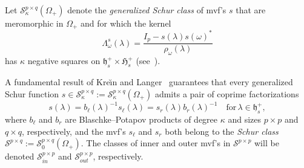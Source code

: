 \documentclass[12pt,twoside,a4paper]{amsart}
\theoremstyle{definition}
\numberwithin{equation}{section}
\begin{document}
Let ${\mathcal S}_{\kappa}^{p\times q}(\Omega_+)$ denote the {\it generalized
Schur class} of mvf's $s$
that are meromorphic in $\Omega_+$ and for which the kernel
\begin{equation}\label{kerLambda}
{\mathsf \Lambda}_\omega^s(\lambda)=
\frac{I_{p}-s(\lambda)s(\omega)^*}{\rho_\omega(\lambda)}
\end{equation}
has $\kappa$ negative squares on ${\mathfrak h}_s^+\times{\mathfrak
H}_s^+$ (see~\cite{KL}).

A fundamental result of  Kre\u{\i}n and Langer~\cite{KL} guarantees that  every
generalized Schur function $s\in
{\mathcal S}_{\kappa}^{p\times q}:={\mathcal S}_{\kappa}^{p\times q}(\Omega_+)$ admits a pair of
coprime factorizations
\begin{equation}\label{KL}
s({\lambda})=b_{\ell}({\lambda})^{-1}s_{\ell}({\lambda})=s_r({\lambda})b_r({\lambda})^{-1}
\quad\text{for}\, {\lambda}\in{\mathfrak h}_s^+,
\end{equation}
where $b_{\ell}$ and $b_r$ are Blaschke--Potapov products of degree
$\kappa$ and sizes ${p\times p}$ and ${q\times q}$, respectively,  and the mvf's
$s_{\ell}$ and $s_r$ both belong to the {\it Schur class} ${\mathcal
S}^{p\times q}:={\mathcal S}_0^{p\times q}(\Omega_+)$. The classes of inner
and outer mvf's in ${\mathcal S}^{p\times p}$ will be denoted  $
{\mathcal S}_{in}^{p\times p}$ and ${\mathcal S}_{out}^{p\times p}$,
respectively.
\end{document}
